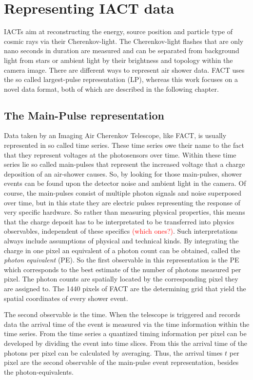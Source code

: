 \chapter{Representing IACT data}
%
IACTs aim at reconstructing the energy, source position and particle type of
cosmic rays via their Cherenkov-light. The Cherenkov-light flashes that are
only nano seconds in duration are measured and can be separated from background
light from stars or ambient light by their brightness and topology within the
camera image. There are different ways to represent air shower data. FACT uses
the so called largest-pulse representation (LP), whereas this work focuses on a novel
data format, both of which are described in the following chapter.

\section{The Main-Pulse representation}
%
Data taken by an Imaging Air Cherenkov Telescope, like FACT, is usually represented in so called time series.
These time series owe their name to the fact that they represent voltages at
the photosensors over time. Within these time series lie so called main-pulses
that represent the increased voltage that a charge deposition of an air-shower
causes. So, by looking for those main-pulses, shower events can be found upon
the detector noise and ambient light in the camera. Of course, the main-pulses
consist of multiple photon signals and noise superposed over time, but in this
state they are electric pulses representing the response of very specific
hardware. So rather than measuring physical properties, this means that the
charge deposit has to be interpretated to be transferred into physics
observables, independent of these specifics \textcolor{red}{(which ones?)}.
Such interpretations always include assumptions of physical and technical
kinds. By integrating the charge in one pixel an equivalent of a photon count
can be obtained, called the \textit{photon equivalent} (PE). So the first
observable in this representation is the PE which corresponds to the best
estimate of the number of photons measured per pixel. The photon counts are
spatially located by the corresponding pixel they are assigned to. The 1440
pixels of FACT are the determining grid that yield the spatial coordinates of
every shower event.

The second observable is the time. When the telescope is triggered and records
data the arrival time of the event is measured via the time information within
the time series. From the time series a quantized timing information per pixel
can be developed by dividing the event into time slices. From this the arrival
time of the photons per pixel can be calculated by averaging. Thus, the arrival
times $t$ per pixel are the second observable of the main-pulse event
representation, besides the photon-equivalents.

